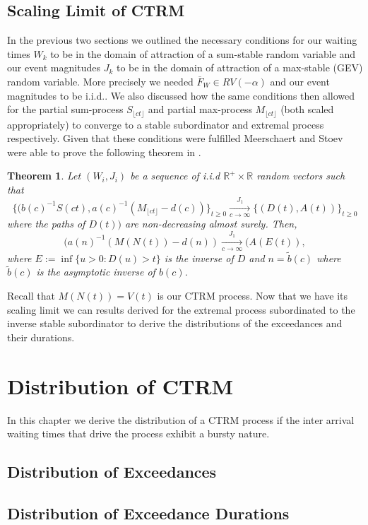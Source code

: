 \documentclass[honours,12pt]{UNSWthesis}
\newcommand{\1}{\mathbf 1}
\newcommand{\Floor}[1]{{\lfloor {#1} \rfloor}}
\newtheorem{theorem}{Theorem}[section]
\numberwithin{equation}{section}
\theoremstyle{definition}
\theoremstyle{remark}
\begin{document}
\section{Scaling Limit of CTRM}
In the previous two sections we outlined the necessary conditions for our waiting times $W_k$ to be in the domain of attraction of a sum-stable random variable and our event magnitudes $J_k$ to be in the domain of attraction of a max-stable (GEV) random variable. More precisely we needed $\overline F_W \in RV(-\alpha)$ and our event magnitudes to be i.i.d.. We also discussed how the same conditions then allowed for the partial sum-process $S_{\Floor{ct}}$ and partial max-process $M_{\Floor{ct}}$ (both scaled appropriately) to converge to a stable subordinator and extremal process respectively. Given that these conditions were fulfilled Meerschaert and Stoev were able to prove the following theorem in \cite{MeerschaertStoev08}.

\begin{theorem}

        Let $(W_i,J_i)$ be a sequence of i.i.d $\mathbb{R}^+\times\mathbb{R}$ random vectors such that
        \[
            \{(b(c)^{-1}S(ct),a(c)^{-1}(M_{\Floor{ct}}-d(c))\}_{t\geq0} \xrightarrow[c\to \infty]{J_1} \{(D(t),A(t))\}_{t\geq0}
        \]
        where the paths of $D(t))$ are non-decreasing almost surely. Then,
        \[
            (a(n)^{-1}(M(N(t))-d(n)) \xrightarrow[c\to \infty]{J_1} (A(E(t)),
        \]
where $E:=\inf \{u>0:D(u)>t\}$ is the inverse of $D$ and $n= \tilde{b}(c)$ where $\tilde{b}(c)$ is the asymptotic inverse of $b(c)$.
\end{theorem}
Recall that $M(N(t))=V(t)$ is our CTRM process. Now that we have its scaling limit we can results derived for the extremal process subordinated to the inverse stable subordinator to derive the distributions of the exceedances and their durations.
\chapter{Distribution of CTRM}
In this chapter we derive the distribution of a CTRM process if the inter arrival waiting times that drive the process exhibit a bursty nature.
\section{Distribution of Exceedances}
\section{Distribution of Exceedance Durations}
\end{document}
